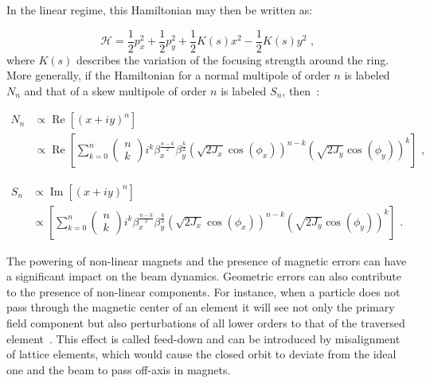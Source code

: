 In the linear regime, this Hamiltonian may then be written as:

\begin{equation}
    \mathcal{H} = \frac{1}{2} p_x^2 + \frac{1}{2} p_y^2 + \frac{1}{2} K(s) x^2 - \frac{1}{2} K(s) y^2 \text{ ,}
    \label{equation:hamiltonian_linear_lattice}
\end{equation}
where \(K(s)\) describes the variation of the focusing strength around the ring.
More generally, if the Hamiltonian for a \gls{normal} multipole of order \(n\) is labeled \(N_n\) and that of a \gls{skew} multipole of order \(n\) is labeled \(S_n\), then~\cite{PHD:Maclean, PHD:Persson}:

\begin{equation}
    \begin{aligned}
        N_n & \propto \operatorname{Re} \left[(x + i y)^n \right] \\
            & \propto \operatorname{Re} \left[ \sum_{k=0}^n \begin{pmatrix} n \\ k \end{pmatrix} i^k \beta_x^{\frac{n-k}{2}} \beta_y^{\frac{k}{2}} \left(\sqrt{2 J_x} \cos\left(\phi_x\right) \right)^{n-k} \left( \sqrt{2 J_y} \cos\left(\phi_y\right) \right)^k \right] \text{ ,}
    \end{aligned}
    \label{equation:hamiltonian_prop_normal_multipoles}
\end{equation}

\begin{equation}
    \begin{aligned}
        S_n & \propto \operatorname{Im} \left[(x + i y)^n \right] \\
            & \propto \left[ \sum_{k=0}^n \begin{pmatrix} n \\ k \end{pmatrix} i^k \beta_x^{\frac{n-k}{2}} \beta_y^{\frac{k}{2}} \left(\sqrt{2 J_x} \cos\left(\phi_x\right) \right)^{n-k} \left( \sqrt{2 J_y} \cos\left(\phi_y\right) \right)^k \right] \text{ .}
    \end{aligned}
    \label{equation:hamiltonian_prop_skew_multipoles}
\end{equation}

The powering of non-linear magnets and the presence of magnetic errors can have a significant impact on the beam dynamics.
Geometric errors can also contribute to the presence of non-linear components.
For instance, when a particle does not pass through the magnetic center of an element it will see not only the primary field component but also perturbations of all lower orders to that of the traversed element~\cite{BOOK:Wiedemann:Particle_Accelerator_Physics}.
This effect is called \gls{feed-down} and can be introduced by misalignment of lattice elements, which would cause the closed orbit to deviate from the ideal one and the beam to pass off-axis in magnets.

